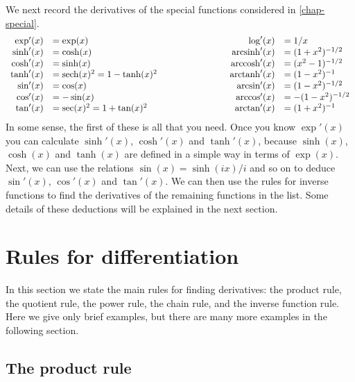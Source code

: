 \documentclass[a4paper]{book}
\theoremstyle{definition}
\begin{document}
We next record the derivatives of the special functions considered
in \autoref{chap-special}.
\[ \begin{array}{rlcrl}
 \exp'(x)     &= \exp(x) &\hspace{6em}&
 \log'(x)     &= 1/x \\
 \sinh'(x)    &= \cosh(x) &&
 \operatorname{arcsinh}'(x) &= (1+x^2)^{-1/2} \\
 \cosh'(x)    &= \sinh(x) &&
 \operatorname{arccosh}'(x) &= (x^2-1)^{-1/2} \\
 \tanh'(x)    &= \operatorname{sech}(x)^2 = 1 - \tanh(x)^2 &&
 \operatorname{arctanh}'(x) &= (1-x^2)^{-1} \\
 \sin'(x)     &= \cos(x) &&
 \arcsin'(x)  &= (1-x^2)^{-1/2} \\
 \cos'(x)     &= -\sin(x) &&
 \arccos'(x)  &= -(1-x^2)^{-1/2} \\
 \tan'(x)     &= \sec(x)^2 = 1 + \tan(x)^2 &&
 \arctan'(x)  &= (1+x^2)^{-1}
\end{array} \]
In some sense, the first of these is all that you need.  Once you know
$\exp'(x)$ you can calculate $\sinh'(x)$, $\cosh'(x)$ and $\tanh'(x)$,
because $\sinh(x)$, $\cosh(x)$ and $\tanh(x)$ are defined in a simple
way in terms of $\exp(x)$.  Next, we can use the relations
$\sin(x)=\sinh(ix)/i$ and so on to deduce $\sin'(x)$, $\cos'(x)$ and
$\tan'(x)$.  We can then use the rules for inverse functions to find
the derivatives of the remaining functions in the list.  Some details
of these deductions will be explained in the next section.

\section{Rules for differentiation}
\label{sec-diff-rules}

In this section we state the main rules for finding derivatives:
the product rule, the quotient rule, the power rule, the chain rule,
and the inverse function rule.  Here we give only brief examples, but
there are many more examples in the following section.

\subsection{The product rule}
\label{subsec-rule-prod}
\end{document}
